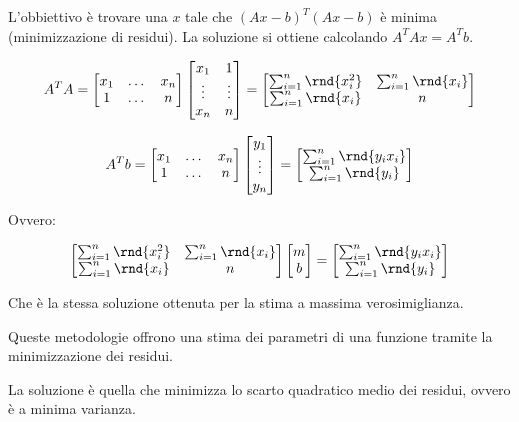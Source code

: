\documentclass[\main/main.tex]{subfiles}
\begin{document}
L'obbiettivo è trovare una $x$ tale che $(Ax-b)^T(Ax-b)$ è minima (minimizzazione di residui).
La soluzione si ottiene calcolando $A^TAx = A^Tb$.

\[
  A^TA = \begin{bmatrix}
    x_1 & \dots & x_n \\
    1   & \dots & n
  \end{bmatrix}
  \begin{bmatrix}
    x_1    & 1      \\
    \vdots & \vdots \\
    x_n    & n
  \end{bmatrix}
  =
  \begin{bmatrix}
    \sum_{i=1}^n \rnd{x_i^2 } & \sum_{i=1}^n \rnd{x_i } \\
    \sum_{i=1}^n \rnd{x_i }   & n
  \end{bmatrix}
\]

\[
  A^Tb = \begin{bmatrix}
    x_1 & \dots & x_n \\
    1   & \dots & n
  \end{bmatrix}
  \begin{bmatrix}
    y_1    \\
    \vdots \\
    y_n
  \end{bmatrix}
  =
  \begin{bmatrix}
    \sum_{i=1}^n \rnd{y_i x_i } \\
    \sum_{i=1}^n \rnd{y_i }
  \end{bmatrix}
\]

Ovvero:

\[
  \begin{bmatrix}
    \sum_{i=1}^n \rnd{x_i^2 } & \sum_{i=1}^n \rnd{x_i } \\
    \sum_{i=1}^n \rnd{x_i }   & n
  \end{bmatrix}
  \begin{bmatrix}
    m \\
    b
  \end{bmatrix}
  =
  \begin{bmatrix}
    \sum_{i=1}^n \rnd{y_i x_i } \\
    \sum_{i=1}^n \rnd{y_i }
  \end{bmatrix}
\]

Che è la stessa soluzione ottenuta per la stima a massima verosimiglianza.

Queste metodologie offrono una stima dei parametri di una funzione tramite la minimizzazione dei residui.

La soluzione è quella che minimizza lo scarto quadratico medio dei residui, ovvero è a minima varianza.
\end{document}
